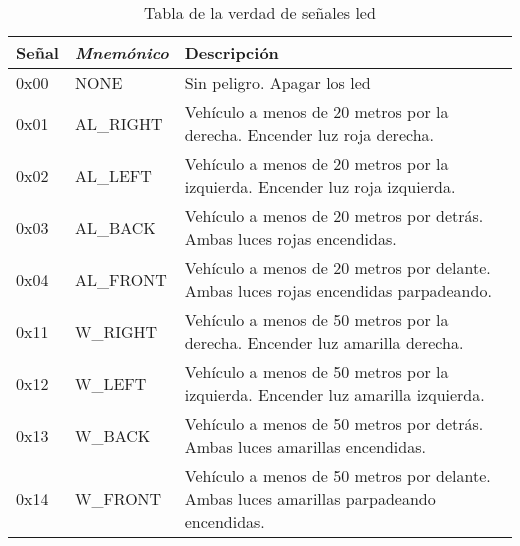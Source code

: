 \begin{table}[h]
	\centering
	\caption{Tabla de la verdad de señales led}\label{tab:tablaVerdadLED}
	\begin{tabular}{llp{10cm}}
		\toprule
		\textbf{Señal} & \emph{Mnemónico} & Descripción \\
		\midrule
		0x00 & NONE    & Sin peligro. Apagar los led \\
		0x01 & AL\_RIGHT &	Vehículo a menos de 20 metros por la derecha.
													Encender luz roja derecha.
												\\
		0x02 & AL\_LEFT &
												Vehículo a menos de 20 metros por la izquierda.
												Encender luz roja izquierda.
											 \\
		0x03 & AL\_BACK &
												Vehículo a menos de 20 metros por detrás. Ambas luces
												rojas	encendidas.
											 \\
		0x04 & AL\_FRONT &
												Vehículo a menos de 20 metros por delante. Ambas luces
												rojas	encendidas parpadeando.
											 \\
		0x11 & W\_RIGHT &
												Vehículo a menos de 50 metros por la derecha. Encender
												luz amarilla derecha.
											\\
		0x12 & W\_LEFT &
												Vehículo a menos de 50 metros por la izquierda.
												Encender luz amarilla izquierda.
											\\
		0x13 & W\_BACK &
												Vehículo a menos de 50 metros por detrás. Ambas luces
												amarillas encendidas.
											\\
		0x14 & W\_FRONT &
												Vehículo a menos de 50 metros por delante. Ambas luces
												amarillas	parpadeando encendidas.
											\\
		\bottomrule
	\end{tabular}
\end{table}
